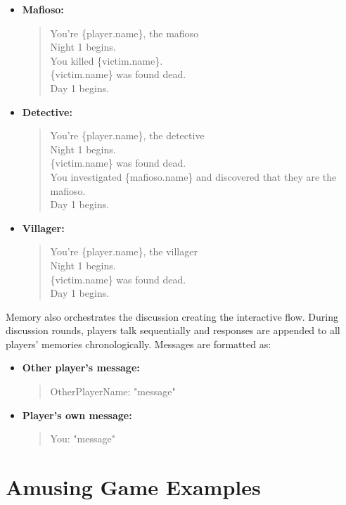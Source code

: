 \documentclass{article}
\begin{document}
\begin{itemize}
    \item \textbf{Mafioso:}
    \begin{quote}
    You're \{player.name\}, the mafioso\\
    Night 1 begins.\\
    You killed \{victim.name\}.\\
    \{victim.name\} was found dead.\\
    Day 1 begins.
    \end{quote}
    
    \item \textbf{Detective:}
    \begin{quote}
    You're \{player.name\}, the detective\\
    Night 1 begins.\\
    \{victim.name\} was found dead.\\
    You investigated \{mafioso.name\} and discovered that they are the mafioso.\\
    Day 1 begins.
    \end{quote}
    
    \item \textbf{Villager:}
    \begin{quote}
    You're \{player.name\}, the villager\\
    Night 1 begins.\\
    \{victim.name\} was found dead.\\
    Day 1 begins.
    \end{quote}
\end{itemize}

Memory also orchestrates the discussion creating the interactive flow. During discussion rounds, players talk sequentially and responses are appended to all players' memories chronologically. Messages are formatted as:

\begin{itemize}
    \item \textbf{Other player's message:}
    \begin{quote}
        OtherPlayerName: "message"
    \end{quote}
    \item \textbf{Player's own message:}
    \begin{quote}
        You: "message"
    \end{quote}
\end{itemize}


\section{Amusing Game Examples}
\label{appendix:exceptional_games}
\end{document}
